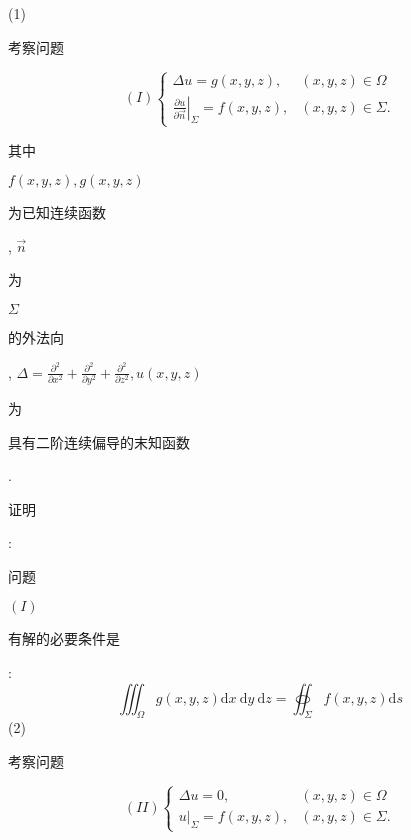 \documentclass[10pt]{article}
\begin{document}
(1) \begin{CJK}{UTF8}{mj}考察问题\end{CJK}
$$
(I) \begin{cases}\Delta u=g(x, y, z), & (x, y, z) \in \Omega \\ \left.\frac{\partial u}{\partial \vec{n}}\right|_{\Sigma}=f(x, y, z), & (x, y, z) \in \Sigma .\end{cases}
$$
\begin{CJK}{UTF8}{mj}其中\end{CJK} $f(x, y, z), g(x, y, z)$ \begin{CJK}{UTF8}{mj}为已知连续函数\end{CJK}, $\vec{n}$ \begin{CJK}{UTF8}{mj}为\end{CJK} $\Sigma$ \begin{CJK}{UTF8}{mj}的外法向\end{CJK}, $\Delta=\frac{\partial^{2}}{\partial x^{2}}+\frac{\partial^{2}}{\partial y^{2}}+\frac{\partial^{2}}{\partial z^{2}}, u(x, y, z)$ \begin{CJK}{UTF8}{mj}为\end{CJK} \begin{CJK}{UTF8}{mj}具有二阶连续偏导的末知函数\end{CJK}. \begin{CJK}{UTF8}{mj}证明\end{CJK}: \begin{CJK}{UTF8}{mj}问题\end{CJK} $(I)$ \begin{CJK}{UTF8}{mj}有解的必要条件是\end{CJK}:
$$
\iiint_{\Omega} g(x, y, z) \mathrm{d} x \mathrm{~d} y \mathrm{~d} z=\oiint_{\Sigma} f(x, y, z) \mathrm{d} s
$$
(2) \begin{CJK}{UTF8}{mj}考察问题\end{CJK}
$$
(I I) \begin{cases}\Delta u=0, & (x, y, z) \in \Omega \\ \left.u\right|_{\Sigma}=f(x, y, z), & (x, y, z) \in \Sigma .\end{cases}
$$
\end{document}
